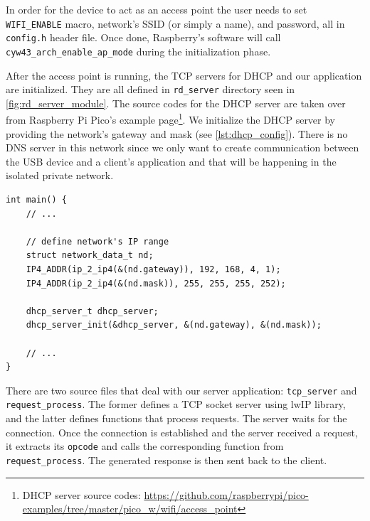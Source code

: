 In order for the device to act as an access point the user needs to set \verb|WIFI_ENABLE| macro, network's SSID (or simply a name), and password, all in \verb|config.h| header file. Once done, Raspberry's software will call \verb|cyw43_arch_enable_ap_mode| during the initialization phase.

After the access point is running, the TCP servers for DHCP and our application are initialized. They are all defined in \verb|rd_server| directory seen in \autoref{fig:rd_server_module}. The source codes for the DHCP server are taken over from Raspberry Pi Pico's example page\footnote{DHCP server source codes: \url{https://github.com/raspberrypi/pico-examples/tree/master/pico_w/wifi/access_point}}. We initialize the DHCP server by providing the network's gateway and mask (see \autoref{lst:dhcp_config}). There is no DNS server in this network since we only want to create communication between the USB device and a client's application and that will be happening in the isolated private network.

\begin{lstlisting}
int main() {
    // ...

    // define network's IP range
    struct network_data_t nd;
    IP4_ADDR(ip_2_ip4(&(nd.gateway)), 192, 168, 4, 1);
    IP4_ADDR(ip_2_ip4(&(nd.mask)), 255, 255, 255, 252);

    dhcp_server_t dhcp_server;
    dhcp_server_init(&dhcp_server, &(nd.gateway), &(nd.mask));

    // ...
}
\end{lstlisting}

There are two source files that deal with our server application: \verb|tcp_server| and \verb|request_process|. The former defines a TCP socket server using lwIP library, and the latter defines functions that process requests. The server waits for the connection. Once the connection is established and the server received a request, it extracts its \verb|opcode| and calls the corresponding function from \verb|request_process|. The generated response is then sent back to the client.

